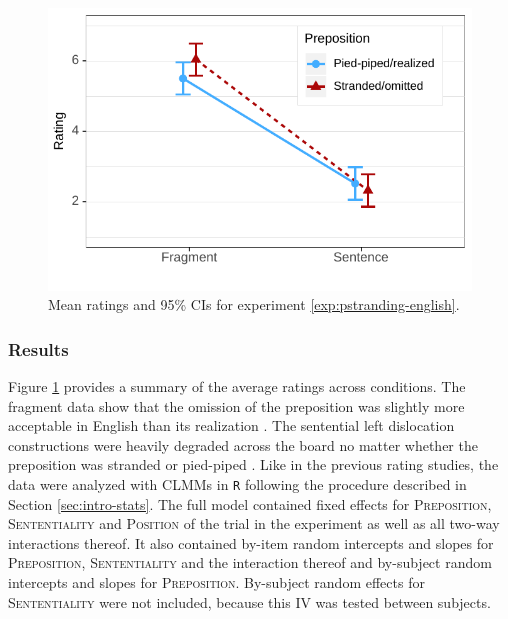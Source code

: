 \begin{figure}[t]
\includegraphics[scale=1]{figures/pst_en_estimates}
 \caption{Mean ratings and 95\% CIs for experiment \ref{exp:pstranding-english}. \label{fig:pstranding-english-estimates}}
\end{figure}

\subsubsection{Results} \label{sec:pstranding-english-results}

Figure \ref{fig:pstranding-english-estimates} provides a summary of the average ratings across conditions. The fragment data show that the omission of the preposition was slightly more acceptable in English  than its realization . The sentential left dislocation constructions were heavily degraded across the board no matter whether the preposition was stranded   or pied-piped . Like in the previous rating studies, the data were analyzed with CLMMs in \texttt{R} following the procedure described in Section \ref{sec:intro-stats}. The full model contained fixed effects for \textsc{Preposition}, \textsc{Sententiality} and \textsc{Position} of the trial in the experiment as well as all two-way interactions thereof. It also contained by-item random intercepts and slopes for \textsc{Preposition}, \textsc{Sententiality} and the interaction thereof and by-subject random intercepts and slopes for \textsc{Preposition}. By-subject random effects for \textsc{Sententiality} were not included, because this IV was tested between subjects. 

